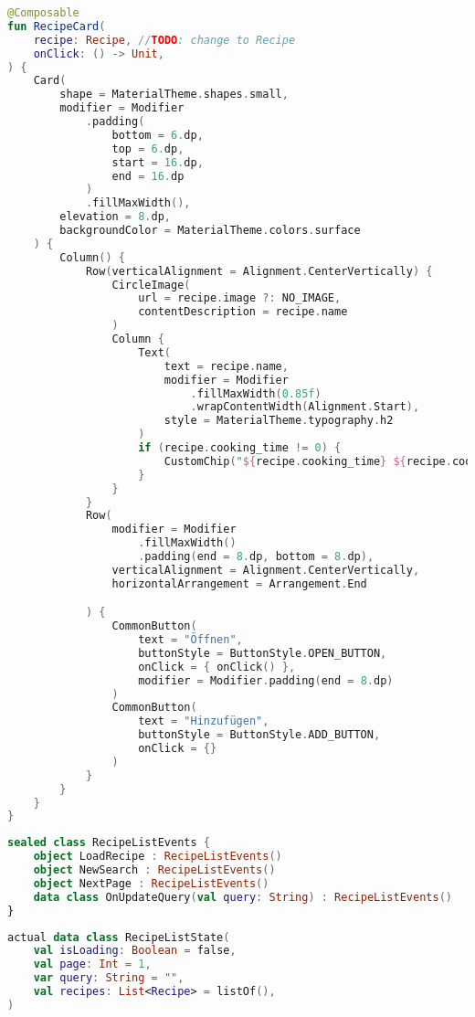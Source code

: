 \begin{lstlisting}[caption={Recipe Card},label={lst:recipe_card}, language=kotlin]
@Composable
fun RecipeCard(
    recipe: Recipe, //TODO: change to Recipe
    onClick: () -> Unit,
) {
    Card(
        shape = MaterialTheme.shapes.small,
        modifier = Modifier
            .padding(
                bottom = 6.dp,
                top = 6.dp,
                start = 16.dp,
                end = 16.dp
            )
            .fillMaxWidth(),
        elevation = 8.dp,
        backgroundColor = MaterialTheme.colors.surface
    ) {
        Column() {
            Row(verticalAlignment = Alignment.CenterVertically) {
                CircleImage(
                    url = recipe.image ?: NO_IMAGE,
                    contentDescription = recipe.name
                )
                Column {
                    Text(
                        text = recipe.name,
                        modifier = Modifier
                            .fillMaxWidth(0.85f)
                            .wrapContentWidth(Alignment.Start),
                        style = MaterialTheme.typography.h2
                    )
                    if (recipe.cooking_time != 0) {
                        CustomChip("${recipe.cooking_time} ${recipe.cooking_time_unit}")
                    }
                }
            }
            Row(
                modifier = Modifier
                    .fillMaxWidth()
                    .padding(end = 8.dp, bottom = 8.dp),
                verticalAlignment = Alignment.CenterVertically,
                horizontalArrangement = Arrangement.End

            ) {
                CommonButton(
                    text = "Öffnen",
                    buttonStyle = ButtonStyle.OPEN_BUTTON,
                    onClick = { onClick() },
                    modifier = Modifier.padding(end = 8.dp)
                )
                CommonButton(
                    text = "Hinzufügen",
                    buttonStyle = ButtonStyle.ADD_BUTTON,
                    onClick = {}
                )
            }
        }
    }
}
\end{lstlisting}

\begin{lstlisting}[caption={RecipeListEvents},label={lst:recipeListEvents}, language=kotlin]
sealed class RecipeListEvents {
    object LoadRecipe : RecipeListEvents()
    object NewSearch : RecipeListEvents()
    object NextPage : RecipeListEvents()
    data class OnUpdateQuery(val query: String) : RecipeListEvents()
}
\end{lstlisting}

\begin{lstlisting}[caption={RecipeListState},label={lst:recipeListState}, language=kotlin]
actual data class RecipeListState(
    val isLoading: Boolean = false,
    val page: Int = 1,
    var query: String = "",
    val recipes: List<Recipe> = listOf(),
)
\end{lstlisting}
